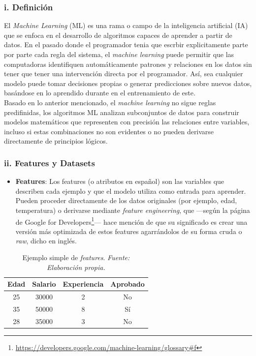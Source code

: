 \documentclass[11pt]{article} %
\begin{document}
\subsubsection{i. Definición} 
\vspace{3pt}
El \textit{Machine Learning} (ML) es una rama o campo de la inteligencia artificial (IA) que se enfoca en el desarrollo de algoritmos capaces de aprender a partir de datos. En el pasado donde el programador tenia que escrbir explicitamente parte por parte cada regla del sistema, el \textit{machine learning} puede permitir que las computadoras identifiquen automáticamente patrones y relaciones en los datos sin tener que tener una intervención directa por el programador. Así, sea cualquier modelo puede tomar decisiones propias o generar predicciones sobre nuevos datos, basándose en lo aprendido durante en el entrenamiento de este. \\[3pt]
Basado en lo anterior mencionado, el \textit{machine learning} no sigue reglas predifinidas, los algoritmos ML analizan subconjuntos de datos para construir modelos matemáticos que representen con precisión las relaciones entre variables, incluso si estas combinaciones no son evidentes o no pueden derivarse directamente de principios lógicos.

\vspace{8pt}
\subsubsection{ii. Features y Datasets}\vspace{2pt}
\begin{itemize}
    \item \textbf{Features}: Los features (o atributos en español) son las variables que describen cada ejemplo y que el modelo utiliza como entrada para aprender. 
    Pueden proceder directamente de los datos originales (por ejemplo, edad, temperatura) o derivarse mediante \textit{feature engineering}, que —según la página de Google for Developers\footnote{\url{https://developers.google.com/machine-learning/glossary\#f}}— hace mención de que su significado es crear una versión más optimizada de estos features agarrándolos de su forma cruda o \textit{raw}, dicho en inglés.
\end{itemize}

\begin{table}[h]
\centering
\caption{Ejemplo simple de \textit{features}. \textit{Fuente: Elaboración propia.}}

\label{tab:simple_features}
\begin{tabular}{|c|c|c|c|}
\hline
\textbf{Edad} & \textbf{Salario} & \textbf{Experiencia} & \textbf{Aprobado} \\
\hline
25 & 30000 & 2 & No \\
\hline
35 & 50000 & 8 & Sí \\
\hline
28 & 35000 & 3 & No \\
\hline
\end{tabular}
\end{table}
\end{document}
